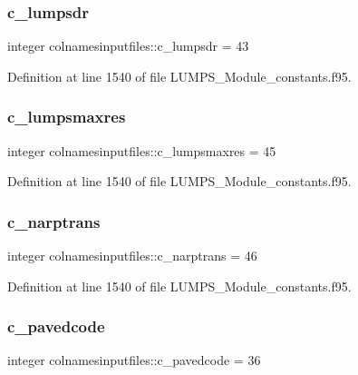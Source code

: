 \subsubsection{\texorpdfstring{c\+\_\+lumpsdr}{c\_lumpsdr}}
{\footnotesize\ttfamily integer colnamesinputfiles\+::c\+\_\+lumpsdr = 43}



Definition at line 1540 of file L\+U\+M\+P\+S\+\_\+\+Module\+\_\+constants.\+f95.

\mbox{\label{namespacecolnamesinputfiles_ad466968b4cdd794a5eb6b62e072bcbdb}} 
\subsubsection{\texorpdfstring{c\+\_\+lumpsmaxres}{c\_lumpsmaxres}}
{\footnotesize\ttfamily integer colnamesinputfiles\+::c\+\_\+lumpsmaxres = 45}



Definition at line 1540 of file L\+U\+M\+P\+S\+\_\+\+Module\+\_\+constants.\+f95.

\mbox{\label{namespacecolnamesinputfiles_a2f7a919691e19ab3b4530964bb7d59ba}} 
\subsubsection{\texorpdfstring{c\+\_\+narptrans}{c\_narptrans}}
{\footnotesize\ttfamily integer colnamesinputfiles\+::c\+\_\+narptrans = 46}



Definition at line 1540 of file L\+U\+M\+P\+S\+\_\+\+Module\+\_\+constants.\+f95.

\mbox{\label{namespacecolnamesinputfiles_aa6cbac2a118fa736e41076c46c1e9a78}} 
\subsubsection{\texorpdfstring{c\+\_\+pavedcode}{c\_pavedcode}}
{\footnotesize\ttfamily integer colnamesinputfiles\+::c\+\_\+pavedcode = 36}



